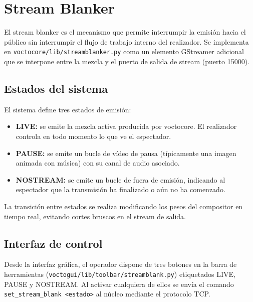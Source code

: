 \section{Stream Blanker}

El stream blanker es el mecanismo que permite interrumpir la emisión hacia el público
sin interrumpir el flujo de trabajo interno del realizador. Se implementa en
\texttt{voctocore/lib/streamblanker.py} como un elemento GStreamer adicional que se
interpone entre la mezcla y el puerto de salida de stream (puerto 15000).

\subsection{Estados del sistema}

El sistema define tres estados de emisión:

\begin{itemize}
  \item \textbf{LIVE:} se emite la mezcla activa producida por voctocore. El realizador
        controla en todo momento lo que ve el espectador.
  \item \textbf{PAUSE:} se emite un bucle de vídeo de pausa (típicamente una imagen
        animada con música) con su canal de audio asociado.
  \item \textbf{NOSTREAM:} se emite un bucle de fuera de emisión, indicando al
        espectador que la transmisión ha finalizado o aún no ha comenzado.
\end{itemize}

La transición entre estados se realiza modificando los pesos del compositor en tiempo
real, evitando cortes bruscos en el stream de salida.

\subsection{Interfaz de control}

Desde la interfaz gráfica, el operador dispone de tres botones en la barra de
herramientas (\texttt{voctogui/lib/toolbar/streamblank.py}) etiquetados LIVE, PAUSE
y NOSTREAM. Al activar cualquiera de ellos se envía el comando
\texttt{set\_stream\_blank <estado>} al núcleo mediante el protocolo TCP.



